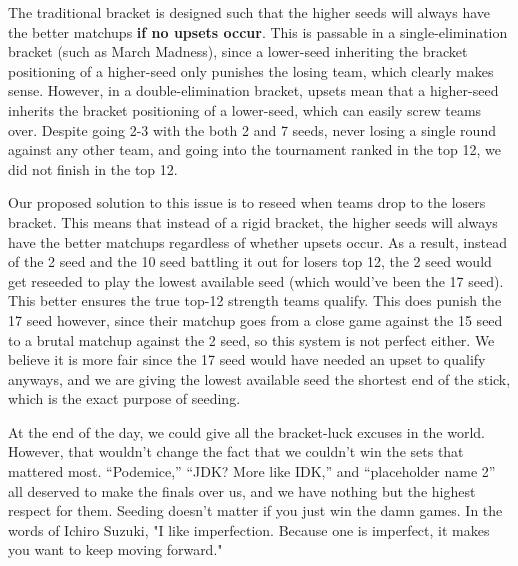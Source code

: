 \medskip

The traditional bracket is designed such that the higher seeds will always have the better matchups \textbf{if no upsets occur}. This is passable in a single-elimination bracket (such as March Madness), since a lower-seed inheriting the bracket positioning of a higher-seed only punishes the losing team, which clearly makes sense. However, in a double-elimination bracket, upsets mean that a higher-seed inherits the bracket positioning of a lower-seed, which can easily screw teams over. Despite going 2-3 with the both 2 and 7 seeds, never losing a single round against any other team, and going into the tournament ranked in the top 12, we did not finish in the top 12.

\medskip

Our proposed solution to this issue is to reseed when teams drop to the losers bracket. This means that instead of a rigid bracket, the higher seeds will always have the better matchups regardless of whether upsets occur. As a result, instead of the 2 seed and the 10 seed battling it out for losers top 12, the 2 seed would get reseeded to play the lowest available seed (which would've been the 17 seed). This better ensures the true top-12 strength teams qualify. This does punish the 17 seed however, since their matchup goes from a close game against the 15 seed to a brutal matchup against the 2 seed, so this system is not perfect either. We believe it is more fair since the 17 seed would have needed an upset to qualify anyways, and we are giving the lowest available seed the shortest end of the stick, which is the exact purpose of seeding.

\medskip

At the end of the day, we could give all the bracket-luck excuses in the world. However, that wouldn't change the fact that we couldn't win the sets that mattered most. ``Podemice,'' ``JDK? More like IDK,'' and ``placeholder name 2'' all deserved to make the finals over us, and we have nothing but the highest respect for them. Seeding doesn't matter if you just win the damn games. In the words of Ichiro Suzuki, "I like imperfection. Because one is imperfect, it makes you want to keep moving forward."